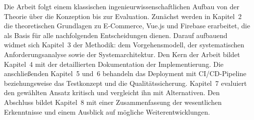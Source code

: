 Die Arbeit folgt einem klassischen ingenieurwissenschaftlichen Aufbau von der Theorie über die Konzeption bis zur Evaluation. Zunächst werden in Kapitel~2 die theoretischen Grundlagen zu E-Commerce, Vue.js und Firebase erarbeitet, die als Basis für alle nachfolgenden Entscheidungen dienen. Darauf aufbauend widmet sich Kapitel~3 der Methodik: dem Vorgehensmodell, der systematischen Anforderungsanalyse sowie der Systemarchitektur. Den Kern der Arbeit bildet Kapitel~4 mit der detaillierten Dokumentation der Implementierung. Die anschließenden Kapitel~5 und~6 behandeln das Deployment mit CI/CD-Pipeline beziehungsweise das Testkonzept und die Qualitätssicherung. Kapitel~7 evaluiert den gewählten Ansatz kritisch und vergleicht ihn mit Alternativen. Den Abschluss bildet Kapitel~8 mit einer Zusammenfassung der wesentlichen Erkenntnisse und einem Ausblick auf mögliche Weiterentwicklungen.